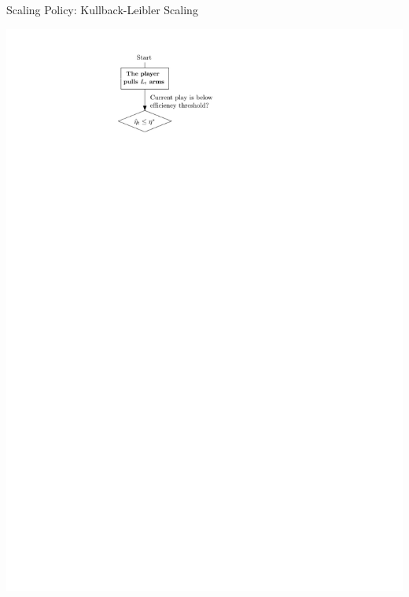 \documentclass[16pt,usenames,dvipsnames, notheorems]{beamer}
\theoremstyle{definition}
\theoremstyle{example}
\theoremstyle{plain}
\begin{document}
\begin{frame}{Scaling Policy: Kullback-Leibler Scaling}
\begin{overprint}
	 \centering \includegraphics[width=0.9\linewidth]{figures/picture_scaling_5-compressed.pdf}

\end{overprint}
\end{frame}
\end{document}
